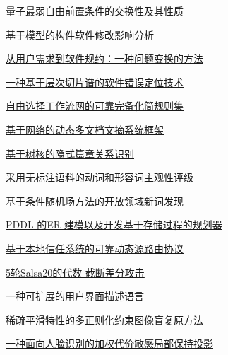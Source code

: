 \documentclass[a4paper]{article}
\begin{document}
\href{http://www.jos.org.cn/ch/reader/download_pdf.aspx?file_no=4354&year_id=2013&quarter_id=5&falg=1}{量子最弱自由前置条件的交换性及其性质}

\href{http://www.jos.org.cn/ch/reader/download_pdf.aspx?file_no=4371&year_id=2013&quarter_id=5&falg=1}{基于模型的构件软件修改影响分析}

\href{http://www.jos.org.cn/ch/reader/download_pdf.aspx?file_no=4398&year_id=2013&quarter_id=5&falg=1}{从用户需求到软件规约：一种问题变换的方法}

\href{http://www.jos.org.cn/ch/reader/download_pdf.aspx?file_no=4342&year_id=2013&quarter_id=5&falg=1}{一种基于层次切片谱的软件错误定位技术}

\href{http://www.jos.org.cn/ch/reader/download_pdf.aspx?file_no=4261&year_id=2013&quarter_id=5&falg=1}{自由选择工作流网的可靠完备化简规则集}

\href{http://www.jos.org.cn/ch/reader/download_pdf.aspx?file_no=4252&year_id=2013&quarter_id=5&falg=1}{基于网络的动态多文档文摘系统框架}

\href{http://www.jos.org.cn/ch/reader/download_pdf.aspx?file_no=4283&year_id=2013&quarter_id=5&falg=1}{基于树核的隐式篇章关系识别}

\href{http://www.jos.org.cn/ch/reader/download_pdf.aspx?file_no=4315&year_id=2013&quarter_id=5&falg=1}{采用无标注语料的动词和形容词主观性评级}

\href{http://www.jos.org.cn/ch/reader/download_pdf.aspx?file_no=4254&year_id=2013&quarter_id=5&falg=1}{基于条件随机场方法的开放领域新词发现}

\href{http://www.jos.org.cn/ch/reader/download_pdf.aspx?file_no=4264&year_id=2013&quarter_id=5&falg=1}{PDDL 的ER 建模以及开发基于存储过程的规划器}

\href{http://www.jos.org.cn/ch/reader/download_pdf.aspx?file_no=4271&year_id=2013&quarter_id=5&falg=1}{基于本地信任系统的可靠动态源路由协议}

\href{http://www.jos.org.cn/ch/reader/download_pdf.aspx?file_no=4266&year_id=2013&quarter_id=5&falg=1}{5轮Salsa20的代数-截断差分攻击}

\href{http://www.jos.org.cn/ch/reader/download_pdf.aspx?file_no=4321&year_id=2013&quarter_id=5&falg=1}{一种可扩展的用户界面描述语言}

\href{http://www.jos.org.cn/ch/reader/download_pdf.aspx?file_no=4256&year_id=2013&quarter_id=5&falg=1}{稀疏平滑特性的多正则化约束图像盲复原方法}

\href{http://www.jos.org.cn/ch/reader/download_pdf.aspx?file_no=4263&year_id=2013&quarter_id=5&falg=1}{一种面向人脸识别的加权代价敏感局部保持投影}
\end{document}
